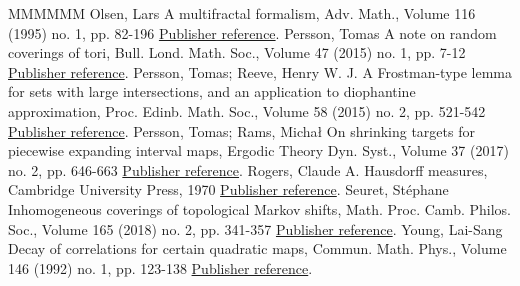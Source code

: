 \begin{thebibliography}{MMMMMM}
 Olsen, Lars A multifractal formalism, Adv. Math., Volume 116 (1995) no. 1, pp. 82-196 \href{https://ahl.centre-mersenne.org/item/AHL_2019__2__1_0/#olsen}{Publisher reference}.
 Persson, Tomas A note on random coverings of tori, Bull. Lond. Math. Soc., Volume 47 (2015) no. 1, pp. 7-12 \href{https://ahl.centre-mersenne.org/item/AHL_2019__2__1_0/#persson}{Publisher reference}.
 Persson, Tomas; Reeve, Henry W. J. A Frostman-type lemma for sets with large intersections, and an application to diophantine approximation, Proc. Edinb. Math. Soc., Volume 58 (2015) no. 2, pp. 521-542 \href{https://ahl.centre-mersenne.org/item/AHL_2019__2__1_0/#perssonreeve}{Publisher reference}.
 Persson, Tomas; Rams, Michał On shrinking targets for piecewise expanding interval maps, Ergodic Theory Dyn. Syst., Volume 37 (2017) no. 2, pp. 646-663 \href{https://ahl.centre-mersenne.org/item/AHL_2019__2__1_0/#perssonrams}{Publisher reference}.
 Rogers, Claude A. Hausdorff measures, Cambridge University Press, 1970 \href{https://ahl.centre-mersenne.org/item/AHL_2019__2__1_0/#rogers}{Publisher reference}.
 Seuret, Stéphane Inhomogeneous coverings of topological Markov shifts, Math. Proc. Camb. Philos. Soc., Volume 165 (2018) no. 2, pp. 341-357 \href{https://ahl.centre-mersenne.org/item/AHL_2019__2__1_0/#seuret}{Publisher reference}.
 Young, Lai-Sang Decay of correlations for certain quadratic maps, Commun. Math. Phys., Volume 146 (1992) no. 1, pp. 123-138 \href{https://ahl.centre-mersenne.org/item/AHL_2019__2__1_0/#young}{Publisher reference}.
\end{thebibliography}
